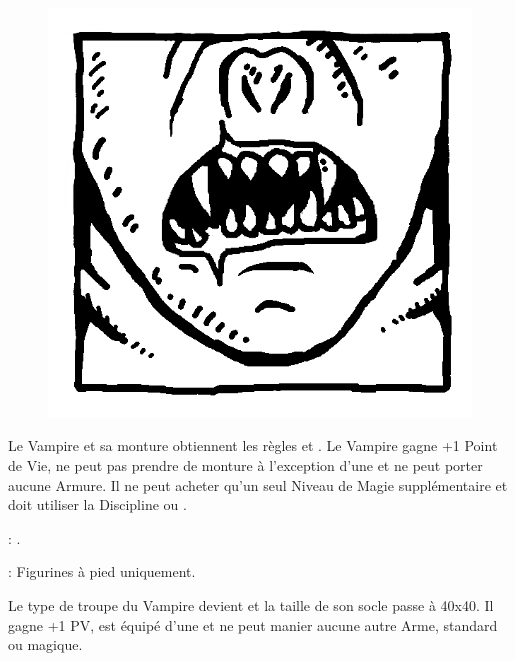 \begin{figure}
\centering
\includegraphics[width=\logosize]{pics/logo_strigoi.png}
\end{figure}
Le Vampire et sa monture obtiennent les règles  et \hatred{}. Le Vampire gagne +1 Point de Vie, ne peut pas prendre de monture à l'exception d'une \shriekinghorror{} et ne peut porter aucune Armure. Il ne peut acheter qu'un seul Niveau de Magie supplémentaire et doit utiliser la Discipline \wilderness{} ou \necromancy{}.

\vspace{0.5cm}
\bloodties{} : \textbf{\ghouls{}}.

\vspace{0.5cm}
\ancientbloodpower{} : \textbf{\bestialbulk}\dotfill{}\newline%
Figurines à pied uniquement.

\vspace{5pt}\noindent{}Le type de troupe du Vampire devient \monstrousinfantry{} et la taille de son socle passe à \unit{40x40}{\milli\meter}. Il gagne +1 PV, est équipé d'une \pw{} et ne peut manier aucune autre Arme, standard ou magique.


